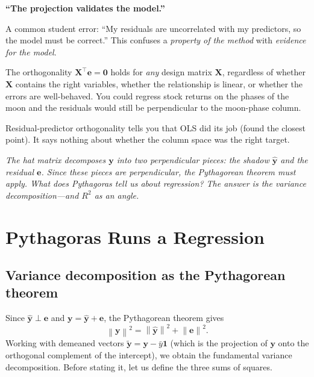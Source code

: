 \documentclass[11pt,a4paper]{article}
\theoremstyle{plain}
\theoremstyle{definition}
\newcommand{\yhat}{\hat{\bm{y}}}
\newcommand{\bX}{\bm{X}}
\newcommand{\by}{\bm{y}}
\newcommand{\be}{\bm{e}}
\newcommand{\norm}[1]{\left\lVert #1 \right\rVert}
\begin{document}
\begin{misconception}
\textbf{``The projection validates the model.''}

A common student error: ``My residuals are uncorrelated with my
predictors, so the model must be correct.'' This confuses a
\emph{property of the method} with \emph{evidence for the model}.

The orthogonality $\bX^\top \be = \bm{0}$ holds for \emph{any}
design matrix $\bX$, regardless of whether $\bX$ contains the
right variables, whether the relationship is linear, or whether
the errors are well-behaved. You could regress stock returns on
the phases of the moon and the residuals would still be
perpendicular to the moon-phase column.

Residual-predictor orthogonality tells you that OLS did its job
(found the closest point). It says nothing about whether the
column space was the right target.
\end{misconception}

\medskip
\noindent\textit{The hat matrix decomposes $\by$ into two perpendicular
pieces: the shadow $\yhat$ and the residual $\be$.
Since these pieces are perpendicular, the Pythagorean theorem must
apply.
What does Pythagoras tell us about regression?
The answer is the variance decomposition---and $R^2$ as an angle.}


\section{Pythagoras Runs a Regression}\label{sec:pythagoras}

\subsection{Variance decomposition as the Pythagorean theorem}

Since $\yhat\perp\be$ and $\by = \yhat + \be$, the Pythagorean theorem gives
\begin{equation}\label{eq:pythag}
  \norm{\by}^2 = \norm{\yhat}^2 + \norm{\be}^2.
\end{equation}
Working with demeaned vectors $\tilde{\by}=\by-\bar{y}\bm{1}$
(which is the projection of $\by$ onto the orthogonal complement of
the intercept), we obtain the fundamental variance decomposition.
Before stating it, let us define the three sums of squares.
\end{document}

